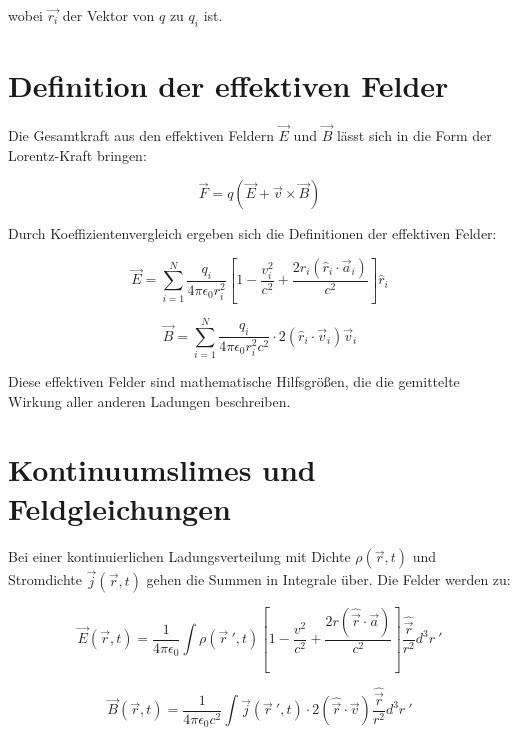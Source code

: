 wobei $\vec{r_i}$ der Vektor von $q$ zu $q_i$ ist.

\section{Definition der effektiven Felder}
Die Gesamtkraft aus den effektiven Feldern $\vec{E}$ und $\vec{B}$ lässt sich in die Form der Lorentz-Kraft bringen:

\begin{equation}
    \label{eq:lorentz_kraft}
    \vec{F} = q \left( \vec{E} + \vec{v} \times \vec{B} \right)
\end{equation}

Durch Koeffizientenvergleich ergeben sich die Definitionen der effektiven Felder:

\begin{equation}
    \vec{E} = \sum_{i=1}^N \frac{q_i}{4\pi\epsilon_0 r_i^2} \left[ 1 - \frac{v_i^2}{c^2} + \frac{2r_i(\hat{r}_i\cdot\vec{a}_i)}{c^2} \right] \hat{r}_i
\end{equation}

\begin{equation}
    \vec{B} = \sum_{i=1}^N \frac{q_i}{4\pi\epsilon_0 r_i^2 c^2} \cdot 2(\hat{r}_i\cdot\vec{v}_i) \vec{v}_i
\end{equation}

Diese effektiven Felder sind mathematische Hilfsgrößen, die die gemittelte Wirkung aller anderen Ladungen beschreiben.

\section{Kontinuumslimes und Feldgleichungen}
\label{sec:kontinuumslimes}
Bei einer kontinuierlichen Ladungsverteilung mit Dichte $\rho(\vec{r}, t)$ und Stromdichte $\vec{j}(\vec{r},t)$ gehen die Summen in Integrale über. Die Felder werden zu:

\begin{equation}
    \vec{E}(\vec{r}, t) = \frac{1}{4\pi\epsilon_0} \int \rho(\vec{r}~', t) \left[ 1 - \frac{v^2}{c^2} + \frac{2r(\hat{\vec{r}}\cdot\vec{a})}{c^2} \right] \frac{\hat{\vec{r}}}{r^2}  d^3r~'
\end{equation}

\begin{equation}
    \vec{B}(\vec{r}, t) = \frac{1}{4\pi\epsilon_0 c^2} \int \vec{j}(\vec{r}~', t) \cdot 2(\hat{\vec{r}}\cdot\vec{v}) \frac{\hat{\vec{r}}}{r^2}  d^3r~'
\end{equation}

